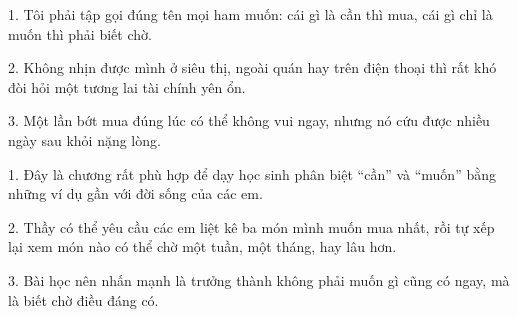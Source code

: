 \begin{turanminh}
1. Tôi phải tập gọi đúng tên mọi ham muốn: cái gì là cần thì mua, cái gì chỉ là muốn thì phải biết chờ.

2. Không nhịn được mình ở siêu thị, ngoài quán hay trên điện thoại thì rất khó đòi hỏi một tương lai tài chính yên ổn.

3. Một lần bớt mua đúng lúc có thể không vui ngay, nhưng nó cứu được nhiều ngày sau khỏi nặng lòng.
\end{turanminh}

\begin{dayhoc}
1. Đây là chương rất phù hợp để dạy học sinh phân biệt ``cần'' và ``muốn'' bằng những ví dụ gần với đời sống của các em.

2. Thầy có thể yêu cầu các em liệt kê ba món mình muốn mua nhất, rồi tự xếp lại xem món nào có thể chờ một tuần, một tháng, hay lâu hơn.

3. Bài học nên nhấn mạnh là trưởng thành không phải muốn gì cũng có ngay, mà là biết chờ điều đáng có.
\end{dayhoc}